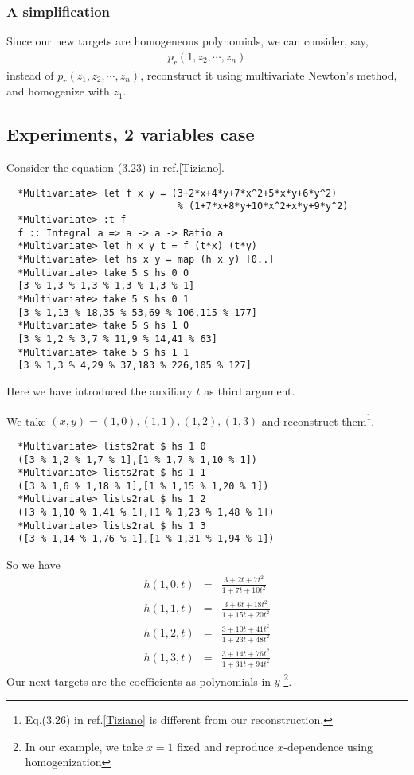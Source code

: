 \documentclass[11pt]{book}
\begin{document}
\subsubsection{A simplification}
Since our new targets are homogeneous polynomials, we can consider, say,
\begin{eqnarray}
p_r(1, z_2, \cdots, z_n)
\end{eqnarray}
instead of $p_r(z_1, z_2, \cdots, z_n)$, reconstruct it using multivariate Newton's method, and homogenize with $z_1$.

\subsection{Experiments, 2 variables case}
Consider the equation (3.23) in ref.\ref{Tiziano}.
\begin{verbatim}
  *Multivariate> let f x y = (3+2*x+4*y+7*x^2+5*x*y+6*y^2)
                              % (1+7*x+8*y+10*x^2+x*y+9*y^2)
  *Multivariate> :t f
  f :: Integral a => a -> a -> Ratio a
  *Multivariate> let h x y t = f (t*x) (t*y)
  *Multivariate> let hs x y = map (h x y) [0..]
  *Multivariate> take 5 $ hs 0 0
  [3 % 1,3 % 1,3 % 1,3 % 1,3 % 1]
  *Multivariate> take 5 $ hs 0 1
  [3 % 1,13 % 18,35 % 53,69 % 106,115 % 177]
  *Multivariate> take 5 $ hs 1 0
  [3 % 1,2 % 3,7 % 11,9 % 14,41 % 63]
  *Multivariate> take 5 $ hs 1 1
  [3 % 1,3 % 4,29 % 37,183 % 226,105 % 127]
\end{verbatim}
Here we have introduced the auxiliary $t$ as third argument.

We take $(x,y) = (1,0), (1,1), (1,2), (1,3)$ and reconstruct them\footnote{Eq.(3.26) in ref.\ref{Tiziano} is different from our reconstruction.
}.
\begin{verbatim}
  *Multivariate> lists2rat $ hs 1 0
  ([3 % 1,2 % 1,7 % 1],[1 % 1,7 % 1,10 % 1])
  *Multivariate> lists2rat $ hs 1 1
  ([3 % 1,6 % 1,18 % 1],[1 % 1,15 % 1,20 % 1])
  *Multivariate> lists2rat $ hs 1 2
  ([3 % 1,10 % 1,41 % 1],[1 % 1,23 % 1,48 % 1])
  *Multivariate> lists2rat $ hs 1 3
  ([3 % 1,14 % 1,76 % 1],[1 % 1,31 % 1,94 % 1])
\end{verbatim}
So we have
\begin{eqnarray}
\label{tizianoExample1}
h(1,0,t) &=& \frac{3+2t+7t^2}{1+7t+10t^2} \\
\label{tizianoExample2}
h(1,1,t) &=& \frac{3+6t+18t^2}{1+15t+20t^2} \\
\label{tizianoExample3}
h(1,2,t) &=& \frac{3+10t+41t^2}{1+23t+48t^2} \\
\label{tizianoExample4}
h(1,3,t) &=& \frac{3+14t+76t^2}{1+31t+94t^2}
\end{eqnarray}
Our next targets are the coefficients as polynomials in $y$ \footnote{
In our example, we take $x=1$ fixed and reproduce $x$-dependence using homogenization
}.
\end{document}
